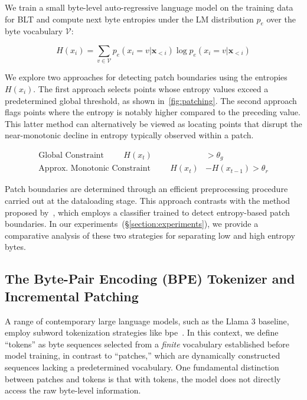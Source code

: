 We train a small byte-level auto-regressive language model on the training data for {\textsc BLT} and compute next byte entropies under the LM distribution $p_{e}$ over the byte vocabulary $\mathcal{V}$:

\begin{equation}
H(x_i) = \sum_{v \in \mathcal{V}} p_{e}(x_i=v|\pmb{x}_{<i}) \log p_{e}(x_i=v|\pmb{x}_{<i})
\end{equation}

We explore two approaches for detecting patch boundaries using the entropies $H(x_i)$. The first approach selects points whose entropy values exceed a predetermined global threshold, as shown in~\autoref{fig:patching}. The second approach flags points where the entropy is notably higher compared to the preceding value. This latter method can alternatively be viewed as locating points that disrupt the near-monotonic decline in entropy typically observed within a patch.

\begin{align*}
    \text{Global Constraint}\hspace{1cm}H(x_t)& > \theta_g\\
    \text{Approx. Monotonic Constraint}\hspace{1cm}H(x_t)& - H(x_{t-1}) > \theta_r
\end{align*}

Patch boundaries are determined through an efficient preprocessing procedure carried out at the dataloading stage. This approach contrasts with the method proposed by~\citet{nawrot-etal-2023-efficient}, which employs a classifier trained to detect entropy-based patch boundaries. In our experiments~(\S\ref{section:experiments}), we provide a comparative analysis of these two strategies for separating low and high entropy bytes.

\subsection{The Byte-Pair Encoding (BPE) Tokenizer and Incremental Patching}
\label{section:incremental-patching}
\label{section:bpe-patch}

A range of contemporary large language models, such as the Llama 3 baseline, employ subword tokenization strategies like bpe~\citep{gage1994new, sennrich-etal-2016-neural}. In this context, we define ``tokens'' as byte sequences selected from a \textit{finite} vocabulary established before model training, in contrast to ``patches,'' which are dynamically constructed sequences lacking a predetermined vocabulary. One fundamental distinction between patches and tokens is that with tokens, the model does not directly access the raw byte-level information.

